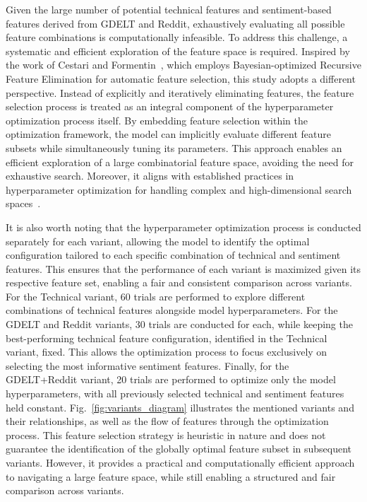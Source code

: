 Given the large number of potential technical features and sentiment-based features derived from GDELT and Reddit, exhaustively evaluating all possible feature combinations is computationally infeasible. To address this challenge, a systematic and efficient exploration of the feature space is required. Inspired by the work of Cestari and Formentin~\cite{d892a}, which employs Bayesian-optimized Recursive Feature Elimination for automatic feature selection, this study adopts a different perspective. Instead of explicitly and iteratively eliminating features, the feature selection process is treated as an integral component of the hyperparameter optimization process itself. By embedding feature selection within the optimization framework, the model can implicitly evaluate different feature subsets while simultaneously tuning its parameters. This approach enables an efficient exploration of a large combinatorial feature space, avoiding the need for exhaustive search. Moreover, it aligns with established practices in hyperparameter optimization for handling complex and high-dimensional search spaces~\cite{mohpo_survey, optuna}.

It is also worth noting that the hyperparameter optimization process is conducted separately for each variant, allowing the model to identify the optimal configuration tailored to each specific combination of technical and sentiment features. This ensures that the performance of each variant is maximized given its respective feature set, enabling a fair and consistent comparison across variants. For the Technical variant, 60 trials are performed to explore different combinations of technical features alongside model hyperparameters. For the GDELT and Reddit variants, 30 trials are conducted for each, while keeping the best-performing technical feature configuration, identified in the Technical variant, fixed. This allows the optimization process to focus exclusively on selecting the most informative sentiment features. Finally, for the GDELT+Reddit variant, 20 trials are performed to optimize only the model hyperparameters, with all previously selected technical and sentiment features held constant. Fig.~\ref{fig:variants_diagram} illustrates the mentioned variants and their relationships, as well as the flow of features through the optimization process. This feature selection strategy is heuristic in nature and does not guarantee the identification of the globally optimal feature subset in subsequent variants. However, it provides a practical and computationally efficient approach to navigating a large feature space, while still enabling a structured and fair comparison across variants.

